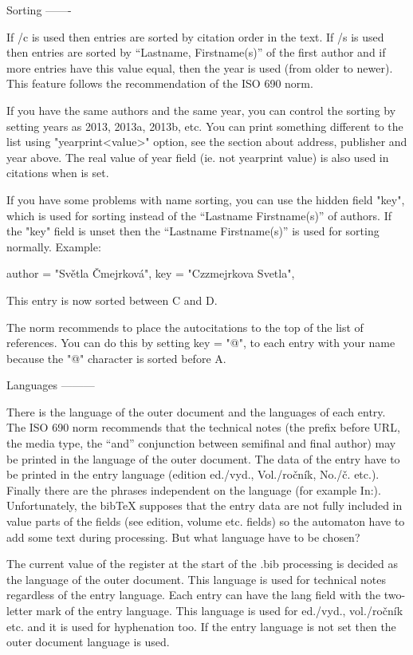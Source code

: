 Sorting
-------

If \usebib/c is used then entries are sorted by citation order in the text.
If \usebib/s is used then entries are sorted by ``Lastname, Firstname(s)'' of
the first author and if more entries have this value equal, then the year is
used (from older to newer). This feature follows the recommendation of the
ISO 690 norm.

If you have the same authors and the same year, you can control the sorting
by setting years as 2013, 2013a, 2013b, etc. You can print something
different to the list using "yearprint{<value>}" option, see the section about
address, publisher and year above. The real value of year field (ie. not
yearprint value) is also used in citations when \nonumcitations is set.

If you have some problems with name sorting, you can use the hidden field
"key", which is used for sorting instead of the ``Lastname Firstname(s)''
of authors. If the "key" field is unset then the ``Lastname Firstname(s)'' 
is used for sorting normally. Example:

  author    = "Světla Čmejrková",
  key       = "Czzmejrkova Svetla",

This entry is now sorted between C and D. 

The norm recommends to place the autocitations to the top of the list of
references. You can do this by setting  key = "@", to each entry with your
name because the "@" character is sorted before A.


Languages
---------

There is the language of the outer document and the languages of each entry.
The ISO 690 norm recommends that the technical notes (the prefix before URL,
the media type, the ``and'' conjunction between semifinal and final author)
may be printed in the language of the outer document. The data of the entry
have to be printed in the entry language (edition ed./vyd., Vol./ročník,
No./č. etc.). Finally there are the phrases independent on the language
(for example In:). Unfortunately, the bibTeX supposes that the entry data
are not fully included in value parts of the fields (see edition, volume
etc. fields) so the automaton have to add some text during processing.
But what language have to be chosen?

The current value of the \language register at the start of the .bib
processing is decided as the language of the outer document. This language
is used for technical notes regardless of the entry language. Each entry can
have the lang field with the two-letter mark of the entry language. This
language is used for ed./vyd., vol./ročník etc. and it is used for
hyphenation too. If the entry language is not set then the outer document
language is used.

